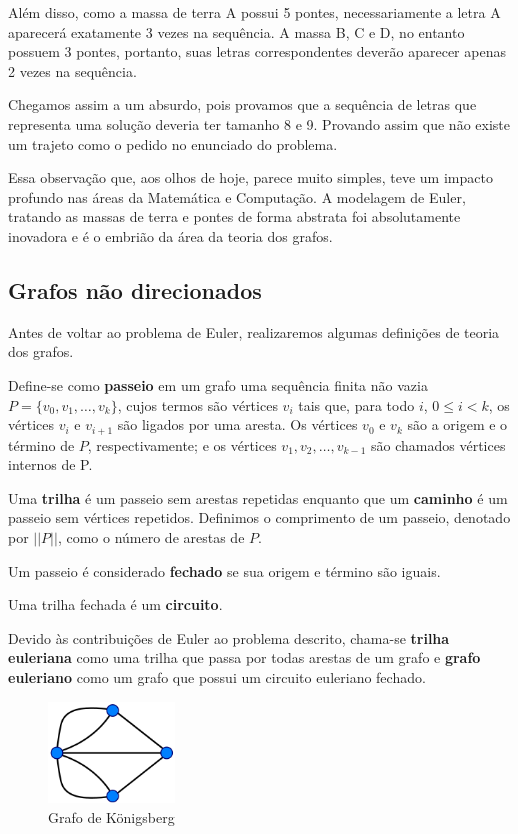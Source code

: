 Além disso, como a massa de terra A possui 5 pontes, necessariamente a letra A aparecerá exatamente 3 vezes na sequência.
A massa B, C e D, no entanto possuem 3 pontes, portanto, suas letras correspondentes deverão aparecer apenas 2 vezes na sequência. 

Chegamos assim a um absurdo, pois provamos que a sequência de letras que representa uma solução deveria ter tamanho 8 e 9.
Provando assim que não existe um trajeto como o pedido no enunciado do problema.

Essa observação que, aos olhos de hoje, parece muito simples, teve um impacto profundo nas áreas da Matemática e Computação.
A modelagem de Euler, tratando as massas de terra e pontes de forma abstrata foi absolutamente inovadora e é o embrião da área da teoria dos grafos.

\subsection{Grafos não direcionados}

Antes de voltar ao problema de Euler, realizaremos algumas definições de teoria dos grafos.

Define-se como \textbf{passeio} em um grafo uma sequência finita não vazia $P = \{ v_0, v_1, \dots, v_k\}$, cujos termos são vértices $v_i$ tais que, para todo $i$, $0 \leq i < k$, os vértices $v_{i}$ e $v_{i+1}$ são ligados por uma aresta. 
Os vértices $v_0$ e $v_k$ são a origem e o término de $P$, respectivamente; e os vértices $v_1, v_2, \dots, v_{k-1}$ são chamados vértices internos de P. 

Uma \textbf{trilha} é um passeio sem arestas repetidas enquanto que um \textbf{caminho} é um passeio sem vértices repetidos.
Definimos o comprimento de um passeio, denotado por $||P||$, como o número de arestas de $P$.

Um passeio é considerado \textbf{fechado} se sua origem e término são iguais.

Uma trilha fechada é um \textbf{circuito}.

Devido às contribuições de Euler ao problema descrito, chama-se \textbf{trilha euleriana} como uma trilha que passa por todas arestas de um grafo e \textbf{grafo euleriano} como um grafo que possui um circuito euleriano fechado.

\begin{figure}
    \centering
    \includegraphics[width=0.3\textwidth]{konigsberg-graph.png}
    \caption{Grafo de Königsberg}
    \label{konigsberg-graph}
\end{figure}

